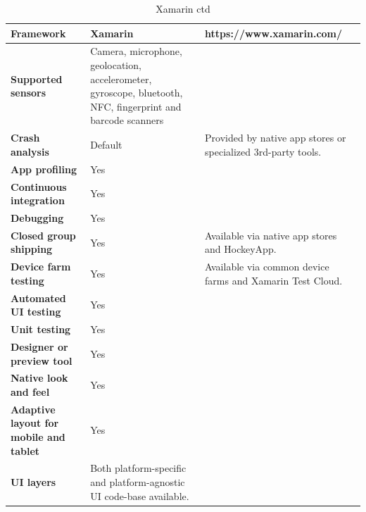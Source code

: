 \documentclass[english,master,public,dept460,male,cpdeclaration,oneside]{diploma}
\begin{document}
\begin{table}[!h]
	\centering
	\caption{Xamarin ctd}
	\begin{tabular}{p{} | p{} | p{}}
		\toprule		
		\textbf{Framework} & \textbf{Xamarin} & https://www.xamarin.com/ \\
		\midrule
		\textbf{Supported sensors} & Camera, microphone, geolocation, accelerometer, gyroscope, bluetooth, NFC, fingerprint and barcode scanners & \\			
		\midrule
		\textbf{Crash analysis} & Default & Provided by native app stores or specialized 3rd-party tools. \\			
		\midrule
		\textbf{App profiling} & Yes & \\			
		\midrule
		\textbf{Continuous integration} & Yes & \\			
		\midrule
		\textbf{Debugging} & Yes & \\			
		\midrule
		\textbf{Closed group shipping} & Yes & Available via native app stores and HockeyApp. \\			
		\midrule
		\textbf{Device farm testing} & Yes & Available via common device farms and Xamarin Test Cloud. \\			
		\midrule
		\textbf{Automated UI testing} & Yes & \\			
		\midrule
		\textbf{Unit testing} & Yes & \\			
		\midrule
		\textbf{Designer or preview tool} & Yes & \\			
		\midrule
		\textbf{Native look and feel} & Yes & \\			
		\midrule
		\textbf{Adaptive layout for mobile and tablet} & Yes & \\			
		\midrule		
		\textbf{UI layers} & Both platform-specific and platform-agnostic UI code-base available. & \\			
		\midrule
	\end{tabular}
\end{table}

\clearpage
\end{document}
